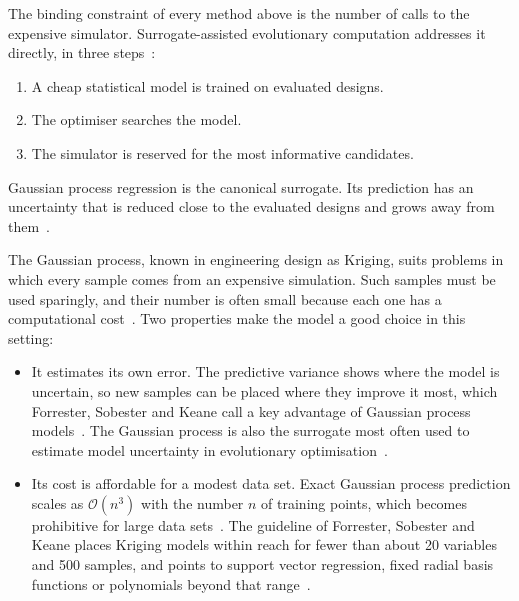 The binding constraint of every method above is the number of calls to
the expensive simulator. Surrogate-assisted evolutionary computation
addresses it directly, in three steps~\cite{jin_2011}:

\begin{enumerate}
  \item A cheap statistical model is trained on evaluated designs.

  \item The optimiser searches the model.

  \item The simulator is reserved for the most informative candidates.
\end{enumerate}

Gaussian process regression is the canonical surrogate. Its prediction
has an uncertainty that is reduced close to the evaluated designs
and grows away from them~\cite{rasmussen_gp_2006}.

The Gaussian process, known in engineering design as Kriging, suits
problems in which every sample comes from an expensive simulation. Such
samples must be used sparingly, and their number is often small because
each one has a computational cost~\cite{forrester_book_2008}. Two
properties make the model a good choice in this setting:

\begin{itemize}
  \item It estimates its own error. The predictive variance shows where
        the model is uncertain, so new samples can be placed where they
        improve it most, which Forrester, Sobester and Keane call a key
        advantage of Gaussian process models~\cite{forrester_book_2008}.
        The Gaussian process is also the surrogate most often used to
        estimate model uncertainty in evolutionary
        optimisation~\cite{jin_2011}.

  \item Its cost is affordable for a modest data set. Exact Gaussian
        process prediction scales as $\mathcal{O}(n^3)$ with the number
        $n$ of training points, which becomes prohibitive for large data
        sets~\cite{rasmussen_gp_2006}. The guideline of Forrester,
        Sobester and Keane places Kriging models within reach for fewer
        than about 20 variables and 500 samples, and points to support
        vector regression, fixed radial basis functions or polynomials
        beyond that range~\cite{forrester_book_2008}.
\end{itemize}

